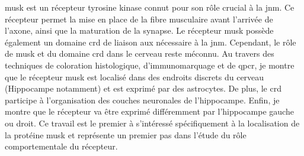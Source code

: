 \Acrshort{musk} est un récepteur tyrosine kinase connut pour son rôle crucial à la \acrshort{jnm}. Ce récepteur permet la mise en place de la fibre musculaire avant l'arrivée de l'axone, ainsi que la maturation de la synapse. Le récepteur \acrshort{musk} possède également un domaine \acrshort{crd} de liaison aux  nécessaire à la \acrshort{jnm}. Cependant, le rôle de \acrshort{musk} et du domaine \acrshort{crd} dans le cerveau reste méconnu. Au travers des techniques de coloration histologique, d'immunomarquage et de \acrshort{qpcr}, je montre que le récepteur \acrshort{musk} est localisé dans des endroits discrets du cerveau (Hippocampe notamment) et est exprimé par des astrocytes. De plus, le \acrshort{crd} participe à l'organisation des couches neuronales de l'hippocampe. Enfin, je montre que le récepteur va être exprimé différemment par l'hippocampe gauche ou droit. Ce travail est le premier à s'intéressé spécifiquement à la localisation de la protéine \acrshort{musk} et représente un premier pas dans l'étude du rôle comportementale du récepteur.